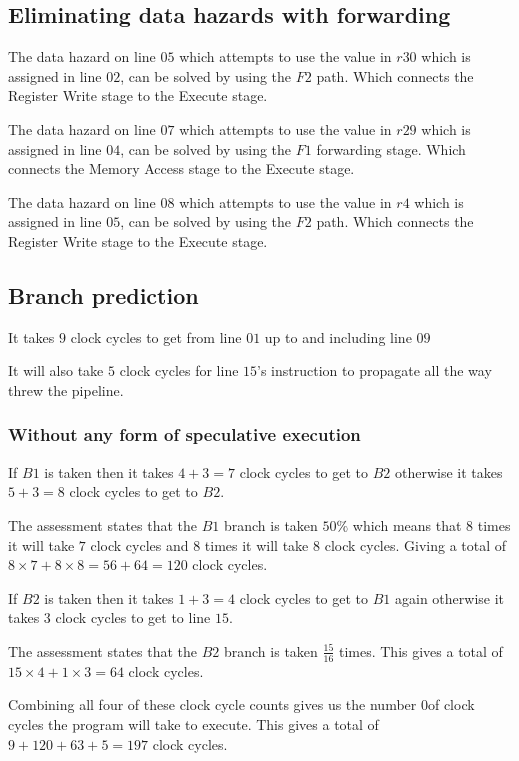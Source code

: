 \documentclass[12pt]{article}
\begin{document}
		\subsection{Eliminating data hazards with forwarding}
			The data hazard on line $05$ which attempts to use the value in $r30$ which is assigned in line $02$, can be solved by using the $F2$ path. Which connects the Register Write stage to the Execute stage.
			
			The data hazard on line $07$ which attempts to use the value in $r29$ which is assigned in line $04$, can be solved by using the $F1$ forwarding stage. Which connects the Memory Access stage to the Execute stage.
			
			The data hazard on line $08$ which attempts to use the value in $r4$ which is assigned in line $05$, can be solved by using the $F2$ path. Which connects the Register Write stage to the Execute stage.
		
		\subsection{Branch prediction}
		
			It takes $9$ clock cycles to get from line $01$ up to and including line $09$
		
			It will also take $5$ clock cycles for line $15$'s instruction to propagate all the way threw the pipeline.
		
			\subsubsection{Without any form of speculative execution}
			
				If $B1$ is taken then it takes $4 + 3 = 7$ clock cycles to get to $B2$ otherwise it takes $5 + 3 = 8$ clock cycles to get to $B2$.
				
				The assessment states that the $B1$ branch is taken $50\%$ which means that $8$ times it will take $7$ clock cycles and $8$ times it will take $8$ clock cycles. Giving a total of $ 8\times7 + 8\times8 = 56 + 64 = 120$ clock cycles.
			
				If $B2$ is taken then it takes $1 + 3 = 4$ clock cycles to get to $B1$ again otherwise it takes $3$ clock cycles to get to line $15$.
				
				The assessment states that the $B2$ branch is taken $\frac{15}{16}$ times. This gives a total of $15\times4 + 1\times3 = 64$ clock cycles.
			
				Combining all four of these clock cycle counts gives us the number 0of clock cycles the program will take to execute.
				This gives a total of $9 + 120 + 63 + 5 = 197$ clock cycles.
			
\end{document}
